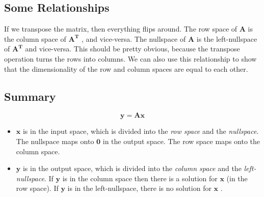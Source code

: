 \documentclass[a4paper,10pt]{article}
\newcommand{\mA}{$\mathbf{A}$ }
\newcommand{\mAT}{$\mathbf{A^T}$ }
\newcommand{\vx}{$\mathbf{x}$ }
\newcommand{\vy}{$\mathbf{y}$ }
\begin{document}

\subsection{Some Relationships}

If we transpose the matrix, then everything flips around. The row space of \mA is the column space of \mAT, and vice-versa. The nullspace of \mA is the left-nullspace of \mAT and vice-versa. This should be pretty obvious, because the transpose operation turns the rows into columns. We can also use this relationship to show that the dimensionality of the row and column spaces are equal to each other.

\subsection{Summary}

\begin{equation}
 \mathbf{y} = \mathbf{A x}
\end{equation}

\begin{itemize}
\item \vx is in the input space, which is divided into the \emph{row space} and the \emph{nullspace}. The nullspace maps onto $\mathbf{0}$ in the output space. The row space maps onto the column space.

\item \vy is in the output space, which is divided into the \emph{column space} and the \emph{left-nullspace}. If \vy is in the column space then there is a solution for \vx (in the row space). If \vy is in the left-nullspace, there is no solution for \vx.

\end{itemize}
\end{document}
